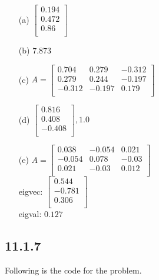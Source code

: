 \documentclass{article}
\begin{document}
\begin{enumerate}
    \item [(a)] $\begin{bmatrix} 0.194 \\ 0.472 \\ 0.86 \\  \end{bmatrix}$
    \item [(b)] $7.873$
    \item [(c)] 
    $A = \begin{bmatrix}
            0.704 & 0.279 & -0.312 \\
            0.279 & 0.244 & -0.197 \\
            -0.312 & -0.197 & 0.179 \\            
    \end{bmatrix}$
    \item [(d)] $\begin{bmatrix}  0.816 \\  0.408 \\ -0.408 \\ \end{bmatrix}, 1.0$
    \item [(e)]
    $A = \begin{bmatrix} 
            0.038 & -0.054 & 0.021 \\
            -0.054 & 0.078 & -0.03 \\
            0.021 & -0.03 & 0.012 \\
    \end{bmatrix}$ \\
    eigvec: $\begin{bmatrix} 0.544 \\ -0.781 \\ 0.306 \\ \end{bmatrix}$ \\
    eigval: $0.127$
\end{enumerate}

\subsection*{11.1.7}
Following is the code for the problem.
\end{document}
